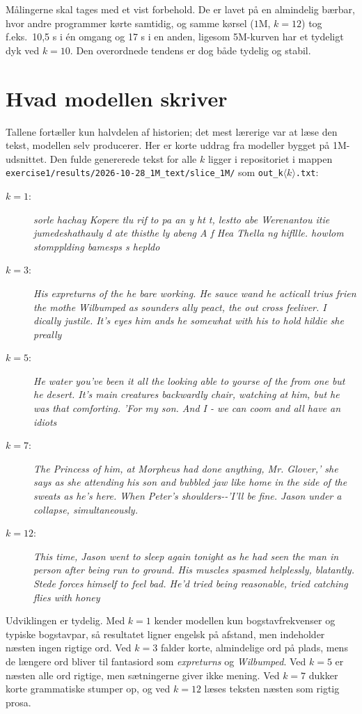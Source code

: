 \documentclass[11pt,a4paper]{article}
\begin{document}
Målingerne skal tages med et vist forbehold. De er lavet på en almindelig bærbar,
hvor andre programmer kørte samtidig, og samme kørsel ($1$M, $k=12$) tog f.eks.\
10{,}5 s i én omgang og 17 s i en anden, ligesom 5M-kurven har et tydeligt dyk ved
$k=10$. Den overordnede tendens er dog både tydelig og stabil.

\section{Hvad modellen skriver}

Tallene fortæller kun halvdelen af historien; det mest lærerige var at læse den
tekst, modellen selv producerer. Her er korte uddrag fra modeller bygget på
1M-udsnittet. Den fulde genererede tekst for alle $k$ ligger i repositoriet i mappen
\texttt{exercise1/results/2026-10-28\_1M\_text/slice\_1M/} som \texttt{out\_k$\langle k\rangle$.txt}:

\begin{description}
  \item[$k=1$:] \textit{sorle hachay Kopere tlu rif to pa an y ht t, lestto abe Werenantou itie jumedeshathauly d ate thisthe ly abeng A f Hea Thella ng hifllle. howlom stompplding bamesps s hepldo}
  \item[$k=3$:] \textit{His expreturns of the he bare working. He sauce wand he acticall trius frien the mothe Wilbumped as sounders ally peact, the out cross feeliver. I dically justile. It's eyes him ands he somewhat with his to hold hildie she preally}
  \item[$k=5$:] \textit{He water you've been it all the looking able to yourse of the from one but he desert. It's main creatures backwardly chair, watching at him, but he was that comforting. 'For my son. And I - we can coom and all have an idiots}
  \item[$k=7$:] \textit{The Princess of him, at Morpheus had done anything, Mr. Glover,' she says as she attending his son and bubbled jaw like home in the side of the sweats as he's here. When Peter's shoulders-{}-'I'll be fine. Jason under a collapse, simultaneously.}
  \item[$k=12$:] \textit{This time, Jason went to sleep again tonight as he had seen the man in person after being run to ground. His muscles spasmed helplessly, blatantly. Stede forces himself to feel bad. He'd tried being reasonable, tried catching flies with honey}
\end{description}

Udviklingen er tydelig. Med $k=1$ kender modellen kun bogstavfrekvenser og typiske
bogstavpar, så resultatet ligner engelsk på afstand, men indeholder næsten ingen
rigtige ord. Ved $k=3$ falder korte, almindelige ord på plads, mens de længere ord
bliver til fantasiord som \textit{expreturns} og \textit{Wilbumped}. Ved $k=5$ er
næsten alle ord rigtige, men sætningerne giver ikke mening. Ved $k=7$ dukker korte
grammatiske stumper op, og ved $k=12$ læses teksten næsten som rigtig prosa.
\end{document}
